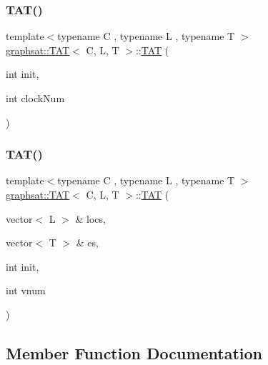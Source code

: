 \subsubsection{\texorpdfstring{TAT()}{TAT()}\hspace{0.1cm}{\footnotesize\ttfamily [2/3]}}
{\footnotesize\ttfamily template$<$typename C , typename L , typename T $>$ \\
\mbox{\hyperlink{classgraphsat_1_1_t_a_t}{graphsat\+::\+T\+AT}}$<$ C, L, T $>$\+::\mbox{\hyperlink{classgraphsat_1_1_t_a_t}{T\+AT}} (\begin{DoxyParamCaption}\item[{int}]{init,  }\item[{int}]{clock\+Num }\end{DoxyParamCaption})\hspace{0.3cm}{\ttfamily [inline]}}

\mbox{\label{classgraphsat_1_1_t_a_t_a06ed502827dfedfe67faf43ba8368806}} 
\subsubsection{\texorpdfstring{TAT()}{TAT()}\hspace{0.1cm}{\footnotesize\ttfamily [3/3]}}
{\footnotesize\ttfamily template$<$typename C , typename L , typename T $>$ \\
\mbox{\hyperlink{classgraphsat_1_1_t_a_t}{graphsat\+::\+T\+AT}}$<$ C, L, T $>$\+::\mbox{\hyperlink{classgraphsat_1_1_t_a_t}{T\+AT}} (\begin{DoxyParamCaption}\item[{vector$<$ L $>$ \&}]{locs,  }\item[{vector$<$ T $>$ \&}]{es,  }\item[{int}]{init,  }\item[{int}]{vnum }\end{DoxyParamCaption})\hspace{0.3cm}{\ttfamily [inline]}}



\subsection{Member Function Documentation}
\mbox{\label{classgraphsat_1_1_t_a_t_aee96b682bbb17951496a296cd3a17c75}} 

